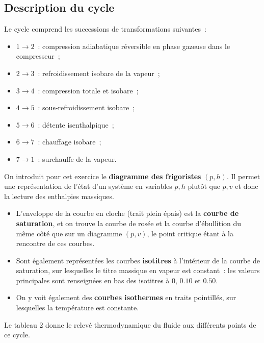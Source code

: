 \documentclass[a4paper, 12pt, garamond]{book}
\begin{document}
\subsection{Description du cycle}

Le cycle comprend les successions de transformations suivantes~:

\begin{itemize}
	\item
	      \(1 \to 2\)~: compression adiabatique réversible en phase gazeuse dans
	      le compresseur~;
	\item
	      \(2 \to 3\)~: refroidissement isobare de la vapeur~;
	\item
	      \(3 \to 4\)~: compression totale et isobare~;
	\item
	      \(4 \to 5\)~: sous-refroidissement isobare~;
	\item
	      \(5 \to 6\)~: détente isenthalpique~;
	\item
	      \(6 \to 7\)~: chauffage isobare~;
	\item
	      \(7 \to 1\)~: surchauffe de la vapeur.
\end{itemize}

On introduit pour cet exercice le \textbf{diagramme des frigoristes} $(p,h)$. Il
permet une représentation de l'état d'un système en variables $p,h$ plutôt que
$p,v$ et donc la lecture des enthalpies massiques.
\begin{itemize}
	\item L'enveloppe de la courbe en cloche (trait plein épais) est la
	      \textbf{courbe de saturation}, et on trouve la courbe de rosée et la courbe
	      d'ébullition du même côté que sur un diagramme $(p,v)$, le point critique
	      étant à la rencontre de ces courbes.

	\item Sont également représentées les courbes \textbf{isotitres} à l'intérieur
	      de la courbe de saturation, sur lesquelles le titre massique en vapeur
	      est constant~: les valeurs principales sont renseignées en bas des
	      isotitres à $0$, $\num{0.10}$ et $\num{0.50}$.

	\item On y voit également des \textbf{courbes isothermes} en traits
	      pointillés, sur lesquelles la température est constante.
\end{itemize}

Le tableau 2 donne le relevé thermodynamique du fluide aux différents
points de ce cycle.
\end{document}
